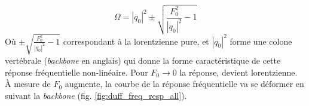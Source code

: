 %
\begin{equation}
    \Omega = |q_0|^2 \pm \sqrt{\frac{F_0^2}{|q_0|^2} - 1 }
    \label{eq:duff_response}
\end{equation}
%
Où $\pm \sqrt{\frac{F_0^2}{|q_0|^2} - 1 }$ correspondant à la lorentzienne pure, et $|q_0|^2$ forme 
une colone vertébrale (\emph{backbone} en anglais) qui donne la forme caractéristique de cette réponse fréquentielle non-linéaire.
%
Pour $F_0 \to 0$ la réponse, devient lorentzienne. À mesure de $F_0$ augmente, la courbe de la réponse fréquentielle va se déformer en suivant la \emph{backbone} (fig. \ref{fig:duff_freq_resp_all}).


